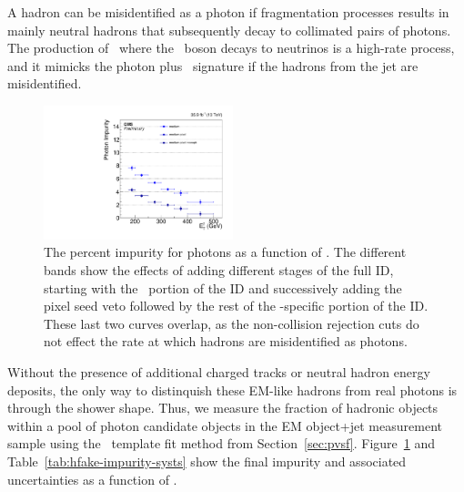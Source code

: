 A hadron can be misidentified as a photon if fragmentation processes results in mainly neutral hadrons that subsequently decay to collimated pairs of photons.
The production of \zj\ where the \PZ\ boson decays to neutrinos is a high-rate process, and it mimicks the photon plus \met\ signature if the hadrons from the jet are misidentified.

\begin{figure}[htbp]
  \centering
  \includegraphics[width=0.49\textwidth]{Analysis/Figures/hfake/plot_impurity_barrel_medium.pdf}
    \caption{
    The percent impurity for photons as a function of \pt. 
    The different bands show the effects of adding different stages of the full ID, starting with the \egamma\ portion of the ID and successively adding the pixel seed veto followed by the rest of the \Pgg-specific portion of the ID.
    These last two curves overlap, as the non-collision rejection cuts do not effect the rate at which hadrons are misidentified as photons.
  }
  \label{fig:impurity-compsb}
\end{figure}

Without the presence of additional charged tracks or neutral hadron energy deposits, the only way to distinquish these EM-like hadrons from real photons is through the shower shape. 
Thus, we measure the fraction of hadronic objects within a pool of photon candidate objects in the EM object+jet measurement sample using the \sieie\ template fit method from Section~\ref{sec:pvsf}.
Figure~\ref{fig:impurity-compsb} and Table~\ref{tab:hfake-impurity-systs} show the final impurity and associated uncertainties as a function of \pt. 

